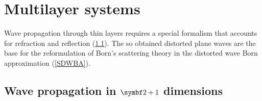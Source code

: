 

\chapter{Multilayer systems}  \label{sec:Multilayers}


%

Wave propagation through thin layers requires
a special formalism that accounts for
refraction and reflection (\cref{Swave21}).
The so obtained distorted plane waves are the base
for the reformulation of Born's scattering theory
in the distorted wave Born approximation (\cref{SDWBA}).


\section[Wave propagation in $2+1$ dimensions]{Wave propagation in $\v{2+1}$ dimensions}\label{Swave21}


